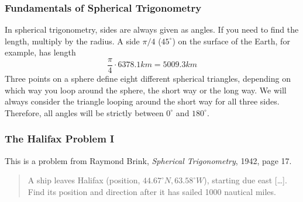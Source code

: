 \documentclass[xcolor=dvipsnames]{beamer}
\begin{document}
\begin{frame}
  \frametitle{Fundamentals of Spherical Trigonometry}
  In spherical trigonometry, sides are always given as angles. If you
  need to find the length, multiply by the radius. A side $\pi/4$
  ($45^{\circ}$) on the surface of the Earth, for example, has length
  \begin{equation}
    \label{eq:likashai}
    \frac{\pi}{4}\cdot{}6378.1km=5009.3km
  \end{equation}
  Three points on a sphere define eight different spherical triangles,
  depending on which way you loop around the sphere, the short way or
  the long way. We will always consider the triangle looping around
  the short way for all three sides. Therefore, all angles will be
  strictly between $0^{\circ}$ and $180^{\circ}$.
\end{frame}

\begin{frame}
  \frametitle{The Halifax Problem I}
This is a problem from Raymond Brink, \emph{Spherical Trigonometry},
1942, page 17.
\begin{quote}
  A ship leaves Halifax (position, $44.67^{\circ}N,63.58^{\circ}W$),
  starting due east [{\ldots}]. Find its
  position and direction after it has sailed 1000 nautical miles.
\end{quote}
\end{frame}
\end{document}
